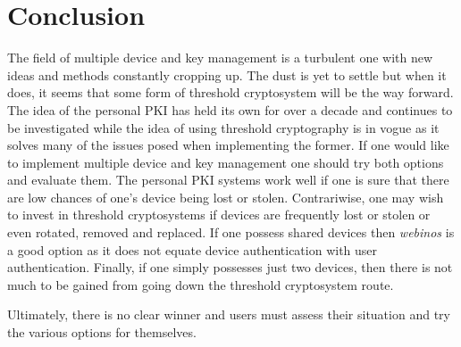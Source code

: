 \section{Conclusion}

The field of multiple device and key management is a turbulent one with new ideas and methods constantly cropping up. The dust is yet to settle but when it does, it seems that some form of threshold cryptosystem will be the way forward. The idea of the personal PKI has held its own for over a decade and continues to be investigated while the idea of using threshold cryptography is in vogue as it solves many of the issues posed when implementing the former. If one would like to implement multiple device and key management one should try both options and evaluate them. The personal PKI systems work well if one is sure that there are low chances of one's device being lost or stolen. Contrariwise, one may wish to invest in threshold cryptosystems if devices are frequently lost or stolen or even rotated, removed and replaced. If one possess shared devices then \textit{webinos} is a good option as it does not equate device authentication with user authentication. Finally, if one simply possesses just two devices, then there is not much to be gained from going down the threshold cryptosystem route.

Ultimately, there is no clear winner and users must assess their situation and try the various options for themselves.

